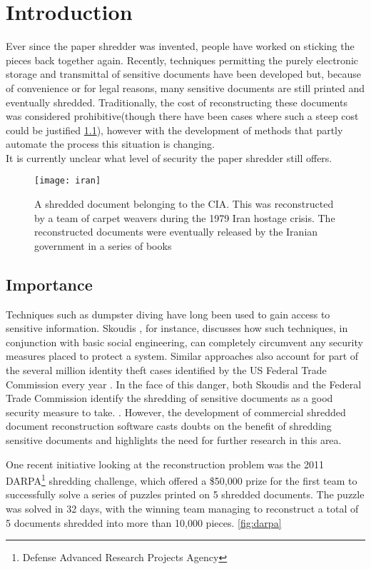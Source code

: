 \chapter{Introduction}
\label{chap1}
Ever since the paper shredder was invented, people have worked on sticking the pieces back together again. Recently, techniques permitting the purely electronic storage and transmittal of sensitive documents have been developed but, because of convenience or for legal reasons, many sensitive documents are still printed and eventually shredded. Traditionally, the cost of reconstructing these documents was considered prohibitive(though there have been cases where such a steep cost could be justified \ref{fig:iranDoc}), however with the development of methods that partly automate the process this situation is changing. \\ It is currently unclear what level of security the paper shredder still offers.

\begin{figure}[h]
    \centering
    \texttt{[image: iran]}
    \caption{A shredded document belonging to the CIA. This was reconstructed by a team of carpet weavers during the 1979 Iran hostage crisis. The reconstructed documents were eventually released by the Iranian government in a series of books \cite{P10}}
    \label{fig:iranDoc}
\end{figure}

\section{Importance}
Techniques such as dumpster diving have long been used to gain access to sensitive information. Skoudis \cite{P11}, for instance, discusses how such techniques, in conjunction with basic social engineering, can completely circumvent any security measures placed to protect a system. Similar approaches also account for part of the several million identity theft cases identified by the US Federal Trade Commission every year \cite{P12}. In the face of this danger, both Skoudis and the Federal Trade Commission identify the shredding of sensitive documents as a good security measure to take. \cite{P11, P13}. However, the development of commercial shredded document reconstruction software \cite{P14} casts doubts on the benefit of shredding sensitive documents and highlights the need for further research in this area.
 
One recent initiative looking at the reconstruction problem was the 2011 DARPA\footnote{Defense Advanced Research Projects Agency} shredding challenge, which offered a \$50,000 prize for the first team to successfully solve a series of  puzzles printed on 5 shredded documents.\cite{P15} The puzzle was solved in 32 days, with the winning team managing to reconstruct a total of 5 documents shredded into more than 10,000 pieces. \ref{fig:darpa}

